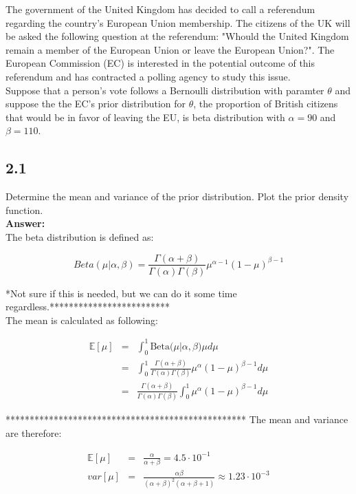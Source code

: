 \documentclass[a4paper]{article}
\begin{document}
The government of the United Kingdom has decided to call a referendum regarding the country's European Union membership. The citizens of the UK will be asked the following question at the referendum: "Whould the United Kingdom remain a member of the European Union or leave the European Union?". The European Commission (EC) is interested in the potential outcome of this referendum and has contracted a polling agency to study this issue.\\
Suppose that a person's vote follows a Bernoulli distribution with paramter $\theta$ and suppose the the EC's prior distribution for $\theta$, the proportion of British citizens that would be in favor of leaving the EU, is beta distribution with $\alpha = 90$ and $\beta = 110$.


\subsection*{2.1}

Determine the mean and variance of the prior distribution. Plot the prior density function.\\

\textbf{Answer:}\\


The beta distribution is defined as:


\begin{equation}
Beta(\mu|\alpha, \beta) = \frac{\Gamma (\alpha + \beta )}{\Gamma(\alpha) \Gamma(\beta)} \mu^{\alpha - 1}(1-\mu)^{\beta - 1}
\end{equation}


*Not sure if this is needed, but we can do it some time regardless.*************************\\
The mean is calculated as following:

\begin{eqnarray}
\mathbb E[\mu] &=& \int_0^{1} \text{Beta(}\mu|\alpha,\beta) \mu d \mu \\
&=& \int_0^1 \frac{\Gamma (\alpha + \beta )}{\Gamma(\alpha) \Gamma(\beta)} \mu^{\alpha}(1-\mu)^{\beta - 1} d\mu \\
&=& \frac{\Gamma (\alpha + \beta )}{\Gamma(\alpha) \Gamma(\beta)} \int_0^1 \mu^{\alpha}(1-\mu)^{\beta - 1} d\mu 
\end{eqnarray}

**************************************************
The mean and variance are therefore:

\begin{eqnarray}
\mathbb E [\mu] &=& \frac{\alpha}{\alpha + \beta } = 4.5\cdot 10^{-1}\\
 var [\mu ] &=& \frac{\alpha \beta}{(\alpha + \beta)^2(\alpha + \beta + 1)} \approx 1.23 \cdot 10^{-3}
\end{eqnarray}
\end{document}

